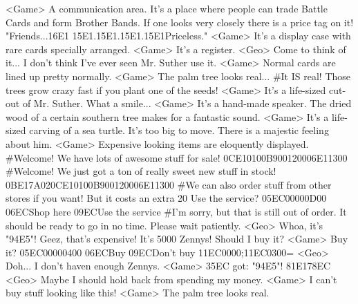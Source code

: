<Game> A communication area. 
It's a place where people can trade Battle Cards and form Brother Bands. 
If one looks very closely there is a price tag on it! 
"Friends...{16}{E1}     {15}{E1}.{15}{E1}.{15}{E1}.{15}{E1}Priceless." 
<Game> It's a display case with rare cards specially arranged. 
<Game> It's a register. 
<Geo> Come to think of it... I don't think I've ever seen Mr. Suther use it. 
<Game> Normal cards are lined up pretty normally. 
<Game> The palm tree looks real... 
#It IS real! 
Those trees grow crazy fast if you plant one of the seeds! 
<Game> It's a life-sized cut-out of Mr. Suther. What a smile... 
<Game> It's a hand-made speaker. 
The dried wood of a certain southern tree makes for a fantastic sound. 
<Game> It's a life-sized carving of a sea turtle. It's too big to move. 
There is a majestic feeling about him. 
<Game> Expensive looking items are eloquently displayed. 
#Welcome! We have lots of awesome stuff for sale! 
{0C}{E1}{01}{00}{B9}{00}{12}{00}{06}{E1}{13}{00}
#Welcome! We just got a ton of really sweet new stuff in stock! 
{0B}{E1}{7A}{02}{0C}{E1}{01}{00}{B9}{00}{12}{00}{06}{E1}{13}{00}
#We can also order stuff from other stores if you want! 
But it costs an extra 20%
Use the service? {05}{EC}{00}{00}{0D}{00}   {06}{EC}Shop here    {09}{EC}Use the service 
#I'm sorry, but that is still out of order. 
It should be ready to go in no time. Please wait patiently. 
<Geo> Whoa, it's "{94}{E5}"! 
Geez, that's expensive! It's 5000 Zennys! Should I buy it? 
<Game> Buy it? {05}{EC}{00}{00}{04}{00}  {06}{EC}Buy   {09}{EC}Don't buy 
{11}{EC}{00}{00};{11}{EC}{03}{00}=
<Geo> Doh... I don't haven enough Zennys. 
<Game> {35}{EC} got: "{94}{E5}"! 
{81}{E1}{78}{EC}
<Geo> Maybe I should hold back from spending my money. 
<Game> I can't buy stuff looking like this! 
<Game> The palm tree looks real. 
